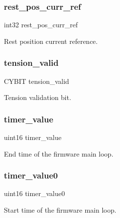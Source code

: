 \subsubsection{rest\+\_\+pos\+\_\+curr\+\_\+ref}
{\footnotesize\ttfamily int32 rest\+\_\+pos\+\_\+curr\+\_\+ref}

Rest position current reference. \mbox{\label{globals_8h_ac42fa606610c2600210d9b7b2c1d0882}} 
\subsubsection{tension\+\_\+valid}
{\footnotesize\ttfamily C\+Y\+B\+IT tension\+\_\+valid}

Tension validation bit. \mbox{\label{globals_8h_a2c95347784600e4a45d481b37eeeef4b}} 
\subsubsection{timer\+\_\+value}
{\footnotesize\ttfamily uint16 timer\+\_\+value}

End time of the firmware main loop. \mbox{\label{globals_8h_a82c5883d1d4a600a1073686f917a812d}} 
\subsubsection{timer\+\_\+value0}
{\footnotesize\ttfamily uint16 timer\+\_\+value0}

Start time of the firmware main loop. 